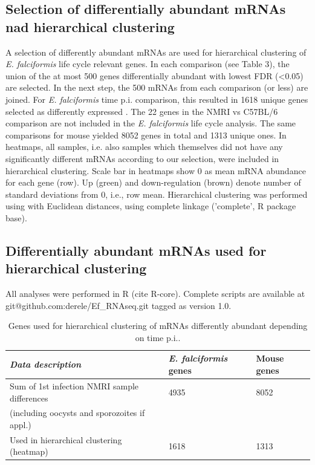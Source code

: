 \documentclass{bmcart}
\begin{document}
\subsection{Selection of differentially abundant mRNAs nad hierarchical clustering}
A selection of differently abundant mRNAs are used for hierarchical
clustering of \textit{E. falciformis} life cycle relevant genes. In
each comparison (see Table 3), the union of the at most 500 genes
differentially abundant with lowest FDR (<0.05) are selected. In the
next step, the 500 mRNAs from each comparison (or less) are
joined. For \textit{E. falciformis} time p.i. comparison, this
resulted in 1618 unique genes selected as differently expressed . The
22 genes in the NMRI vs C57BL/6 comparison are not included in the
\textit{E. falciformis} life cycle analysis. The same comparisons for
mouse yielded 8052 genes in total and 1313 unique ones. In heatmaps,
all samples, i.e. also samples which themselves did not have any
significantly different mRNAs according to our selection, were
included in hierarchical clustering. Scale bar in heatmaps show 0 as
mean mRNA abundance for each gene (row). Up (green) and
down-regulation (brown) denote number of standard deviations from 0,
i.e., row mean. Hierarchical clustering was performed using with
Euclidean distances, using complete linkage ('complete', R package
base).




\subsection{Differentially abundant mRNAs used for hierarchical clustering}
All analyses were performed in R (cite R-core). Complete scripts are
available at git@github.com:derele/Ef\_RNAseq.git tagged as version
1.0. 

\setlength{\tabcolsep}{10pt}
\begin{table}[H]
\small
\begin{center}
\caption{Genes used for hierarchical clustering of mRNAs differently abundant depending on time p.i..}
\begin{tabular}{*3l}    \toprule
	\textit{Data description} & \emph{E. falciformis} genes & Mouse genes	\\ \midrule
	Sum of 1st infection NMRI sample differences	& 4935 & 8052 \\ 
	(including oocysts and sporozoites if appl.)	\\	
	Used in hierarchical clustering (heatmap)  	& 1618 & 1313 \\ 	\bottomrule	
\hline
\end{tabular}
\end{center}
\end{table}
\end{document}
